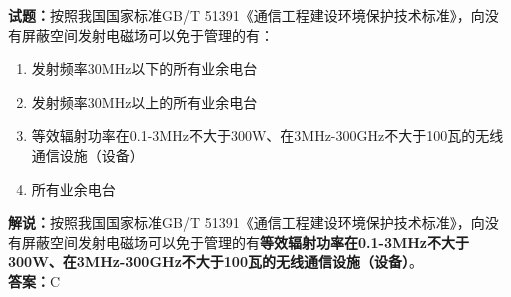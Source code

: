 \documentclass{ctexbook}
\begin{document}
\bigskip


\noindent\textbf{试题：}按照我国国家标准GB/T 51391《通信工程建设环境保护技术标准》，向没有屏蔽空间发射电磁场可以免于管理的有： 
\begin{enumerate}[leftmargin=3em]
\item 发射频率30MHz以下的所有业余电台
\item 发射频率30MHz以上的所有业余电台
\item 等效辐射功率在0.1-3MHz不大于300W、在3MHz-300GHz不大于100瓦的无线通信设施（设备） 
\item 所有业余电台
\end{enumerate}
\noindent\textbf{解说：}按照我国国家标准GB/T 51391《通信工程建设环境保护技术标准》，向没有屏蔽空间发射电磁场可以免于管理的有\textbf{等效辐射功率在0.1-3MHz不大于300W、在3MHz-300GHz不大于100瓦的无线通信设施（设备）}。\\\textbf{答案：}C



\bigskip


%
%


%
%
%
\end{document}
